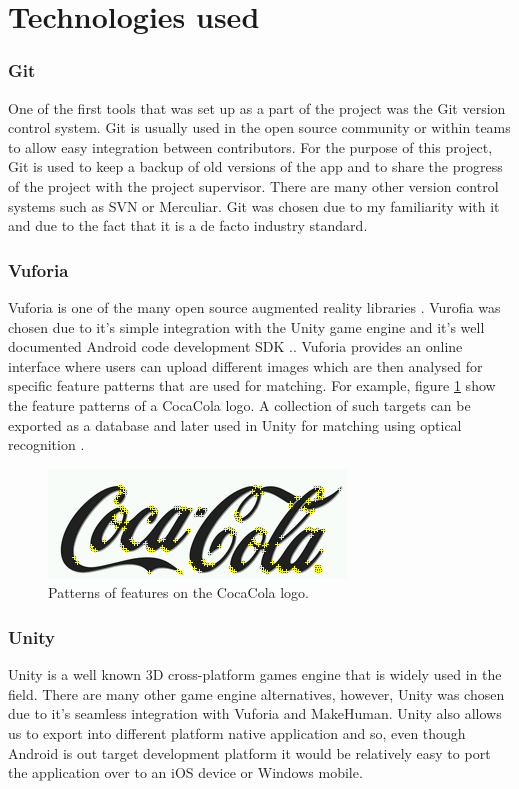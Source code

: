 \documentclass{l4proj}
\begin{document}
\section{Technologies used}
\subsubsection{Git}
One of the first tools that was set up as a part of the project was the Git version control system. Git is usually used in the open source community or within teams to allow easy integration between contributors. For the purpose of this project, Git is used to keep a backup of old versions of the app and to share the progress of the project with the project supervisor. There are many other version control systems such as SVN or Merculiar. Git was chosen due to my familiarity with it and due to the fact that it is a de facto industry standard.
	
\subsubsection{Vuforia}
Vuforia is one of the many open source augmented reality libraries \cite{vuforia_getting_2016}. Vurofia was chosen due to it's simple integration with the Unity game engine and it's well documented Android code development SDK \cite{rao_how_2015}.. Vuforia provides an online interface where users can upload different images which are then analysed for specific feature patterns that are used for matching. For example, figure \ref{fig:coca_cola_features} show the feature patterns of a CocaCola logo. A collection of such targets can be exported as a database and later used in Unity for matching using optical recognition \cite{rao_how_2015}.
\begin{figure}
\centering
\includegraphics[scale=1]{images/coca_cola_features.png}
\caption{Patterns of features on the CocaCola logo.}
\label{fig:coca_cola_features}
\end{figure}

\subsubsection{Unity}
Unity is a well known 3D cross-platform games engine that is widely used in the field. There are many other game engine alternatives, however, Unity was chosen due to it's seamless integration with Vuforia and MakeHuman. Unity also allows us to export into different platform native application and so, even though Android is out target development platform it would be relatively easy to port the application over to an iOS device or Windows mobile. 
\end{document}

